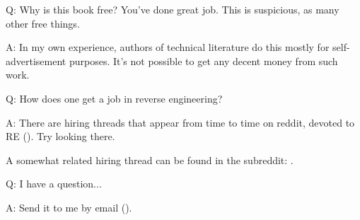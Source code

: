 \par Q: Why is this book free? You've done great job. This is suspicious, as many other free things.
\par A: In my own experience, authors of technical literature do this mostly for self-advertisement purposes. It's not possible to get any decent money from such work.

\par Q: How does one get a job in reverse engineering?
\par A: There are hiring threads that appear from time to time on reddit, devoted to RE\FNURLREDDIT{}
(\RedditHiringThread{}).
Try looking there.

A somewhat related hiring thread can be found in the  subreddit: \NetsecHiringThread{}.

\par Q: I have a question...
\par A: Send it to me by email (\EMAIL).


